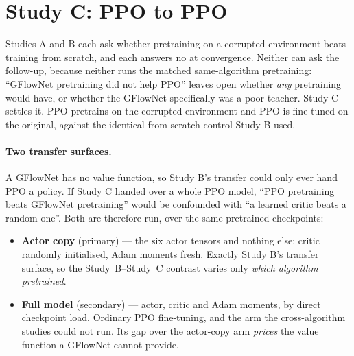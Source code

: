 \clearpage
\section{Study C: PPO to PPO}
\label{sec:studyc}

Studies A and B each ask whether pretraining on a corrupted environment beats
training from scratch, and each answers no at convergence. Neither can ask the
follow-up, because neither runs the matched same-algorithm pretraining: ``GFlowNet
pretraining did not help PPO'' leaves open whether \emph{any} pretraining would
have, or whether the GFlowNet specifically was a poor teacher. Study C settles
it. PPO pretrains on the corrupted environment and PPO is fine-tuned on the
original, against the identical from-scratch control Study B used.

\paragraph{Two transfer surfaces.} A GFlowNet has no value function, so Study B's
transfer could only ever hand PPO a policy. If Study C handed over a whole PPO
model, ``PPO pretraining beats GFlowNet pretraining'' would be confounded with
``a learned critic beats a random one''. Both are therefore run, over the same
pretrained checkpoints:

\begin{itemize}
  \item \textbf{Actor copy} (primary) --- the six actor tensors and nothing else; critic randomly initialised, Adam moments fresh. Exactly Study B's transfer surface, so the Study~B--Study~C contrast varies only \emph{which algorithm pretrained}.
  \item \textbf{Full model} (secondary) --- actor, critic and Adam moments, by direct checkpoint load. Ordinary PPO fine-tuning, and the arm the cross-algorithm studies could not run. Its gap over the actor-copy arm \emph{prices} the value function a GFlowNet cannot provide.
\end{itemize}

